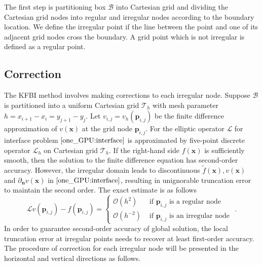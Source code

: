 \documentclass{article}
\begin{document}
The first step is partitioning box $\mathcal{B}$ into Cartesian grid and dividing the Cartesian grid nodes into regular and irregular nodes according to the boundary location. We define the irregular point if the line between the point and one of its adjacent grid nodes cross the boundary. A grid point which is not irregular is defined as a regular point.


\subsection{Correction} \label{one_GPU:correct}

The KFBI method involves making corrections to each irregular node. Suppose $\mathcal{B}$ is partitioned into a uniform Cartesian grid $\mathcal{T}_{h}$ with mesh parameter $h = x_{i+1}-x_{i} = y_{j+1} - y_{j}$. Let $v_{i,j} = v_{h}(\mathbf{p}_{i,j})$ be the finite difference approximation of $v(\mathbf{x})$ at the grid node $\mathbf{p}_{i, j}$. For the elliptic operator $\mathcal{L}$ for interface problem $\eqref{one_GPU:interface}$ is approximated by five-point discrete operator $\mathcal{L}_{h}$ on Cartesian grid $\mathcal{T}_{h}$. If the right-hand side  $f(\mathbf{x})$ is sufficiently smooth, then the solution to the finite difference equation has second-order accuracy. However, the irregular domain leads to discontinuous $\tilde{f}(\mathbf{x}), v(\mathbf{x})$ and $\partial_{\mathbf{n}}v(\mathbf{x})$ in $\eqref{one_GPU:interface}$, resulting in unignorable truncation error to maintain the second order\cite{ying2007kernel}. 
The exact estimate is as follows
$$
\mathcal{L} v(\mathbf{p}_{i,j}) - f(\mathbf{p}_{i,j})=\begin{cases}\mathcal{O}\left(h^{2}\right) & \text { if }\mathbf{p}_{i,j} \text { is a regular node } \\ \mathcal{O}\left(h^{-2}\right) & \text { if }\mathbf{p}_{i,j} \text { is an irregular node }\end{cases}.
$$
 In order to guarantee second-order accuracy of global solution, the local truncation error at irregular points needs to recover at least first-order accuracy\cite{On2008Beale}. The procedure of correction for each irregular node will be presented in the horizontal and vertical directions as follows. 
\end{document}
